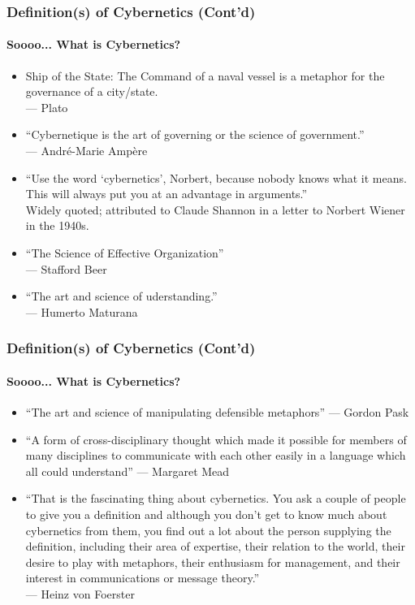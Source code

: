 \documentclass[
	11pt,
	aspectratio=169,
]{beamer}
\begin{document}
		\begin{frame}
			\frametitle{Definition(s) of Cybernetics (Cont'd)}
			\framesubtitle{Soooo... What is Cybernetics?}
			\begin{itemize}
				\item<1->Ship of the State: The Command of a naval vessel is a metaphor for the governance of a city/state.\\
				--- Plato
				\item<2->``Cybernetique is the art of governing or the science of government.''\\
				--- André-Marie Ampère
				\item<3->``Use the word ‘cybernetics’, Norbert, because nobody knows what it means. This will always put you at an advantage in arguments.''\\
				Widely quoted; attributed to Claude Shannon in a letter to Norbert Wiener in the 1940s.
				\item<4->``The Science of Effective Organization''\\
				--- Stafford Beer
				\item<5->``The art and science of uderstanding.''\\
				--- Humerto Maturana
			\end{itemize}
		\end{frame}
	
		\begin{frame}
			\setbeamercovered{transparent}
			\frametitle{Definition(s) of Cybernetics (Cont'd)}
			\framesubtitle{Soooo... What is Cybernetics?}
			\begin{itemize}
				\item<1->``The art and science of manipulating defensible metaphors''
				--- Gordon Pask
				\item<2->``A form of cross-disciplinary thought which made it possible for members of many disciplines to communicate with each other easily in a language which all could understand''
				--- Margaret Mead
				\item<3->``That is the fascinating thing about cybernetics. You ask a couple of people to give you a definition and although you don’t get to know much about cybernetics from them, you find out a lot about the person supplying the definition, including their area of expertise, their relation to the world, their desire to play with metaphors, their enthusiasm for management, and their interest in communications or message theory.''\\
				--- Heinz von Foerster
			\end{itemize}
			\setbeamercovered{invisible}
		\end{frame}
	
\end{document}
